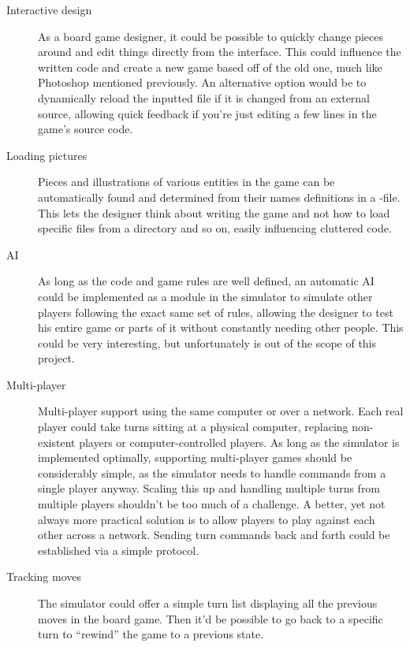 \begin{description}

  \item[Interactive design] As a board game designer, it could be
possible to quickly change pieces around and edit things directly from
the interface. This could influence the written code and create a new
game based off of the old one, much like Photoshop mentioned previously.
An alternative option would be to dynamically reload the inputted file
if it is changed from an external source, allowing quick feedback if
you're just editing a few lines in the game's source code.

  \item[Loading pictures] Pieces and illustrations of various entities
in the game can be automatically found and determined from their names
definitions in a \productname{}-file. This lets the designer think about
writing the game and not how to load specific files from a directory and
so on, easily influencing cluttered code.

  \item[AI] As long as the code and game rules are well defined, an
automatic AI could be implemented as a module in the simulator to
simulate other players following the exact same set of rules, allowing
the designer to test his entire game or parts of it without constantly
needing other people. This could be very interesting, but unfortunately
is out of the scope of this project.

  \item[Multi-player] Multi-player support using the same computer
or over a network. Each real player could take turns sitting at a
physical computer, replacing non-existent players or computer-controlled
players. As long as the simulator is implemented optimally, supporting
multi-player games should be considerably simple, as the simulator
needs to handle commands from a single player anyway. Scaling this up
and handling multiple turns from multiple players shouldn't be too much
of a challenge. A better, yet not always more practical solution is to
allow players to play against each other across a network. Sending turn
commands back and forth could be established via a simple protocol.

  \item[Tracking moves] The simulator could offer a simple turn list
displaying all the previous moves in the board game. Then it'd be
possible to go back to a specific turn to ``rewind'' the game to a
previous state. \end{description}

